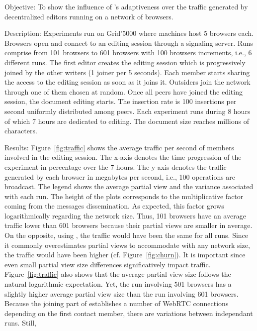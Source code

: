 \begin{asparadesc}
\item [Objective:] To show the influence of \SPRAY's adaptiveness over the
  traffic generated by decentralized editors running on a network of browsers.
\item [Description:] Experiments run on Grid'5000 where machines host 5 browsers
  each. Browsers open \CRATE and connect to an editing session through a
  signaling server.  Runs comprise from 101 browsers to 601 browsers with 100
  browsers increments, i.e., 6 different runs.  The first editor creates the
  editing session which is progressively joined by the other writers (1 joiner
  per 5 seconds). Each member starts sharing the access to the editing session
  as soon as it joins it. Outsiders join the network through one of them chosen
  at random. Once all peers have joined the editing session, the document
  editing starts. The insertion rate is 100 insertions per second uniformly
  distributed among peers. Each experiment runs during 8 hours of which 7 hours
  are dedicated to editing. The document size reaches millions of characters.
\item [Results:] Figure~\ref{fig:traffic} shows the average traffic per second
  of members involved in the editing session. The x-axis denotes the time
  progression of the experiment in percentage over the 7 hours. The y-axis
  denotes the traffic generated by each browser in megabytes per second, i.e.,
  100 operations are broadcast. The legend shows the average partial view and
  the variance associated with each run. The height of the plots corresponds to
  the multiplicative factor coming from the messages dissemination. As expected,
  this factor grows logarithmically regarding the network size. Thus, 101
  browsers have an average traffic lower than 601 browsers because their partial
  views are smaller in average.  On the opposite, using \CYCLON, the traffic
  would have been the same for all runs. Since it commonly overestimates partial
  views to accommodate with any network size, the traffic would have been higher
  (cf. Figure~\ref{fig:churn}). It is important since even small partial view
  size differences significatively impact traffic.  Figure~\ref{fig:traffic}
  also shows that the average partial view size follows the natural logarithmic
  expectation. Yet, the run involving 501 browsers has a slightly higher average
  partial view size than the run involving 601 browsers. Because the joining
  part of \SPRAY establishes a number of WebRTC connections depending on the
  first contact member, there are variations between independant runs. Still,

\end{asparadesc}
